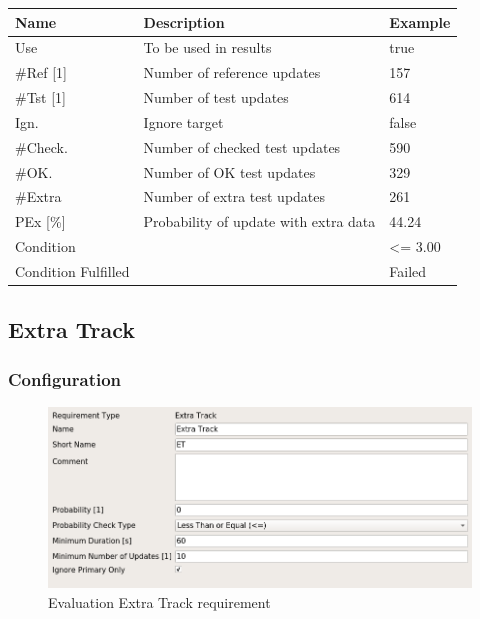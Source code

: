 \begin{center}
 \begin{table}[H]
  \begin{tabularx}{\textwidth}{ | l | X |  l | }
    \hline
    \textbf{Name} & \textbf{Description} & \textbf{Example} \\ \hline
    Use & To be used in results & true \\ \hline
    \#Ref [1] & Number of reference updates & 157 \\ \hline
    \#Tst [1] & Number of test updates & 614 \\ \hline
    Ign. & Ignore target & false \\ \hline
    \#Check. & Number of checked test updates & 590 \\ \hline
    \#OK. & Number of OK test updates & 329 \\ \hline
    \#Extra & Number of extra test updates & 261 \\ \hline
    PEx [\%] & Probability of update with extra data & 44.24 \\ \hline
    Condition &  & <= 3.00 \\ \hline
    Condition Fulfilled &  & Failed \\ \hline
\end{tabularx}
\end{table}
\end{center}

\subsection{Extra Track}
\label{sec:eval_req_extra_track} 

\subsubsection{Configuration}

\begin{figure}[H]
    \includegraphics[width=14cm,frame]{../screenshots/eval_req_extra_track.png}
  \caption{Evaluation Extra Track requirement}
\end{figure}


